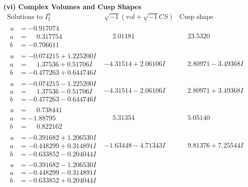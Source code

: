 \documentclass[1p]{elsarticle_modified}
\theoremstyle{definition}
\newcommand{\I}{\sqrt{-1}}
\begin{document}
\newpage\flushleft \textbf{(vi) Complex Volumes and Cusp Shapes}
$$\begin{array}{c|c|c}  
\text{Solutions to }I^u_{2}& \I (\text{vol} + \sqrt{-1}CS) & \text{Cusp shape}\\
 \hline 
\begin{aligned}
u &= -0.917074\phantom{ +0.000000I} \\
a &= \phantom{-}0.317754\phantom{ +0.000000I} \\
b &= -0.706611\phantom{ +0.000000I}\end{aligned}
 & \phantom{-}2.01181\phantom{ +0.000000I} & \phantom{-}23.5320\phantom{ +0.000000I} \\ \hline\begin{aligned}
u &= -0.074215 + 1.225200 I \\
a &= \phantom{-}1.37536 + 0.51706 I \\
b &= -0.477263 + 0.644746 I\end{aligned}
 & -4.31514 + 2.06106 I & \phantom{-}2.80971 - 3.49368 I \\ \hline\begin{aligned}
u &= -0.074215 - 1.225200 I \\
a &= \phantom{-}1.37536 - 0.51706 I \\
b &= -0.477263 - 0.644746 I\end{aligned}
 & -4.31514 - 2.06106 I & \phantom{-}2.80971 + 3.49368 I \\ \hline\begin{aligned}
u &= \phantom{-}0.738441\phantom{ +0.000000I} \\
a &= -1.88795\phantom{ +0.000000I} \\
b &= \phantom{-}0.822162\phantom{ +0.000000I}\end{aligned}
 & \phantom{-}5.31354\phantom{ +0.000000I} & \phantom{-}5.05140\phantom{ +0.000000I} \\ \hline\begin{aligned}
u &= -0.391682 + 1.206530 I \\
a &= -0.448299 + 0.314891 I \\
b &= -0.633852 - 0.204044 I\end{aligned}
 & -1.63448 - 4.71343 I & \phantom{-}9.81376 + 7.25544 I \\ \hline\begin{aligned}
u &= -0.391682 - 1.206530 I \\
a &= -0.448299 - 0.314891 I \\
b &= -0.633852 + 0.204044 I\end{aligned}

\end{array}$$
\end{document}
